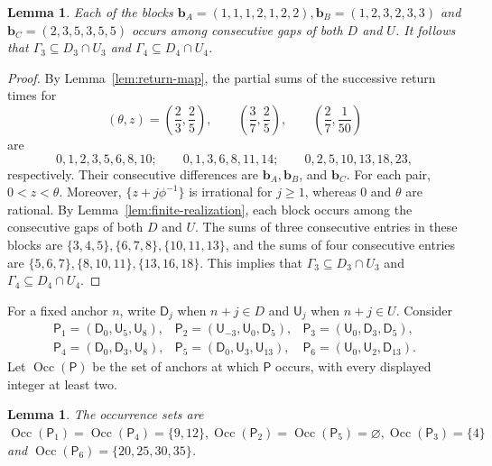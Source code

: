 \documentclass[11pt]{amsart}
\newtheorem{lemma}[theorem]{Lemma}
\theoremstyle{definition}
\begin{document}
\begin{lemma}\label{lem:gap-blocks}
Each of the blocks $\mathbf b_A=(1,1,1,2,1,2,2), \mathbf b_B=(1,2,3,2,3,3)$ and $\mathbf b_C=(2,3,5,3,5,5)$ occurs among consecutive gaps of both $D$ and $U$. It follows that $\Gamma_3\subseteq D_3\cap U_3$ and $\Gamma_4\subseteq D_4\cap U_4$.
\end{lemma}
\begin{proof}
By Lemma~\ref{lem:return-map}, the partial sums of the successive return
times for
\[
(\theta,z)=\left(\frac23,\frac25\right),\qquad
\left(\frac37,\frac25\right),\qquad
\left(\frac27,\frac1{50}\right)
\]
are 
\[
0,1,2,3,5,6,8,10;\qquad
0,1,3,6,8,11,14;\qquad
0,2,5,10,13,18,23,
\]
respectively. Their consecutive differences are $\mathbf b_A,\mathbf b_B$, and $\mathbf b_C$. For each pair, $0<z<\theta$. Moreover, $\{z+j\phi^{-1}\}$ is irrational for $j\geq1$, whereas $0$ and $\theta$ are rational. By Lemma~\ref{lem:finite-realization}, each block
occurs among the consecutive gaps of both $D$ and $U$. The sums of three consecutive entries in these blocks are $\{3,4,5\}, \{6,7,8\}, \{10,11,13\}$, and the sums of four consecutive entries are $\{5,6,7\}, \{8,10,11\}, \{13,16,18\}$. This implies that $\Gamma_3\subseteq D_3\cap U_3$ and
$\Gamma_4\subseteq D_4\cap U_4$.
\end{proof}

For a fixed anchor $n$, write $\mathsf D_j$ when $n+j\in D$ and
$\mathsf U_j$ when $n+j\in U$. Consider
\[
\begin{array}{lll}
\mathsf P_1=(\mathsf D_0,\mathsf U_5,\mathsf U_8),&
\mathsf P_2=(\mathsf U_{-3},\mathsf U_0,\mathsf D_5),&
\mathsf P_3=(\mathsf U_0,\mathsf D_3,\mathsf D_5),\\
\mathsf P_4=(\mathsf D_0,\mathsf D_3,\mathsf U_8),&
\mathsf P_5=(\mathsf D_0,\mathsf U_3,\mathsf U_{13}),&
\mathsf P_6=(\mathsf U_0,\mathsf U_2,\mathsf D_{13}).
\end{array}
\]
Let $\operatorname{Occ}(\mathsf P)$ be the set of anchors at which
$\mathsf P$ occurs, with every displayed integer at least two.

\begin{lemma}\label{lem:exceptional-configurations}
The occurrence sets are $\operatorname{Occ}(\mathsf P_1)=\operatorname{Occ}(\mathsf P_4)=\{9,12\}, \operatorname{Occ}(\mathsf P_2)=\operatorname{Occ}(\mathsf P_5)=\varnothing, \operatorname{Occ}(\mathsf P_3)=\{4\}$ and $\operatorname{Occ}(\mathsf P_6)=\{20,25,30,35\}$.
\end{lemma}
\end{document}
